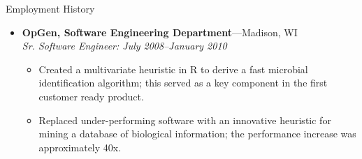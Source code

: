 \documentclass[11pt,oneside]{article}
\newenvironment{ressectionx}[1]{
	\vspace{4pt}
	{\fontfamily{phv}\selectfont\Large#1}
	\begin{itemize}[label={}]
	\vspace{3pt}
}{
	\end{itemize}
}
\newcommand{\ressubitem}[1]{
	\vspace{-1pt}
	\item \begin{flushleft} #1 \end{flushleft}
}
\newcommand{\resbigitem}[3]{
	\vspace{-5pt}
	\item
	\textbf{#1}---#2 \\
	\textit{#3}
}
\newenvironment{ressubsec}[3]{
	\resbigitem{#1}{#2}{#3}
	\vspace{-2pt}
	\begin{itemize}
}{
	\end{itemize}
}
\begin{document}
\begin{ressectionx}{Employment History}
	\begin{ressubsec}{OpGen, Software Engineering Department}{Madison, WI}{Sr. Software Engineer: July 2008--January 2010}
		\ressubitem{Created a multivariate heuristic in R to derive a fast microbial identification algorithm; this served as a key component in the first customer ready product.}
	\ressubitem{Replaced under-performing software with an innovative heuristic for mining a database of biological information; the performance increase was approximately 40x.}

	\end{ressubsec}
	

\end{ressectionx}
\end{document}
